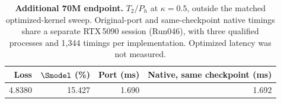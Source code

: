 \begin{table}[!htbp]
\centering\small
\caption{\textbf{Additional 70M endpoint.} $T_2/P_h$ at $\kappa=0.5$, outside the matched optimized-kernel sweep. Original-port and same-checkpoint native timings share a separate RTX\,5090 session (Run046), with three qualified processes and 1,344 timings per implementation. Optimized latency was not measured.}
\label{tab:70m-additional-endpoint}
\begin{tabular}{@{}rrrr@{}}
\toprule
Loss & $\Smodel$ (\%) & Port (ms) & Native, same checkpoint (ms) \\
\midrule
4.8380 & 15.427 & 1.690 & 1.692 \\
\bottomrule
\end{tabular}
\end{table}
